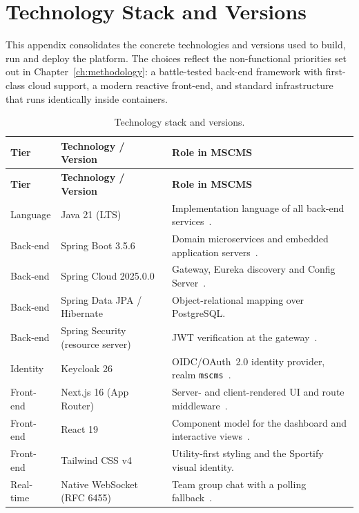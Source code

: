 \chapter{Technology Stack and Versions}
\label{app:stack}

This appendix consolidates the concrete technologies and versions used to build, run and
deploy the platform. The choices reflect the non-functional priorities set out in
Chapter~\ref{ch:methodology}: a battle-tested back-end framework with first-class cloud
support, a modern reactive front-end, and standard infrastructure that runs identically
inside containers.

\renewcommand{\arraystretch}{1.2}
\begin{longtable}{p{} p{} p{}}
\caption{Technology stack and versions.}
\label{tab:app-stack}\\
\toprule
\textbf{Tier} & \textbf{Technology / Version} & \textbf{Role in MSCMS} \\
\midrule
\endfirsthead
\toprule
\textbf{Tier} & \textbf{Technology / Version} & \textbf{Role in MSCMS} \\
\midrule
\endhead
\bottomrule
\endlastfoot
Language & Java 21 (LTS) & Implementation language of all back-end services~\cite{springboot}. \\
Back-end & Spring Boot 3.5.6 & Domain microservices and embedded application servers~\cite{springboot}. \\
Back-end & Spring Cloud 2025.0.0 & Gateway, Eureka discovery and Config Server~\cite{springcloud}. \\
Back-end & Spring Data JPA / Hibernate & Object-relational mapping over PostgreSQL. \\
Back-end & Spring Security (resource server) & JWT verification at the gateway~\cite{jwt}. \\
Identity & Keycloak 26 & OIDC/OAuth~2.0 identity provider, realm \texttt{mscms}~\cite{keycloak}. \\
Front-end & Next.js 16 (App Router) & Server- and client-rendered UI and route middleware~\cite{nextjs}. \\
Front-end & React 19 & Component model for the dashboard and interactive views~\cite{react}. \\
Front-end & Tailwind CSS v4 & Utility-first styling and the Sportify visual identity. \\
Real-time & Native WebSocket (RFC 6455) & Team group chat with a polling fallback~\cite{websocket}. \\

\end{longtable}
